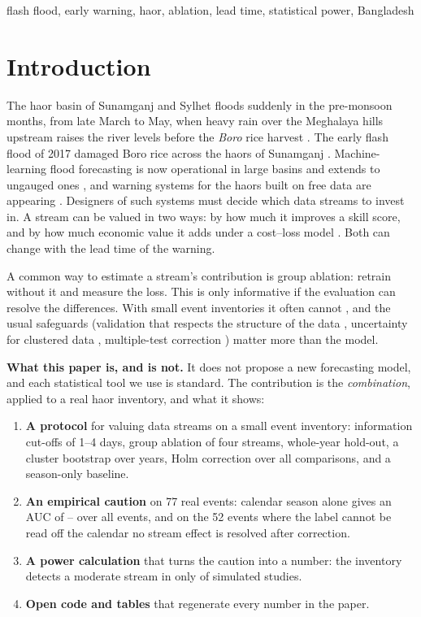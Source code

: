 \begin{IEEEkeywords}
flash flood, early warning, haor, ablation, lead time, statistical power, Bangladesh
\end{IEEEkeywords}

\section{Introduction}
The haor basin of Sunamganj and Sylhet floods suddenly in the pre-monsoon months, from late March to May, when heavy rain over the Meghalaya hills upstream raises the river levels before the \emph{Boro} rice harvest \cite{masood2024,mondal2019}. The early flash flood of 2017 damaged Boro rice across the haors of Sunamganj \cite{mondal2019}. Machine-learning flood forecasting is now operational in large basins \cite{nevo2022} and extends to ungauged ones \cite{nearing2024}, and warning systems for the haors built on free data are appearing \cite{koli2026haorfloodalert}. Designers of such systems must decide which data streams to invest in. A stream can be valued in two ways: by how much it improves a skill score, and by how much economic value it adds under a cost--loss model \cite{richardson2000}. Both can change with the lead time of the warning.

A common way to estimate a stream's contribution is group ablation: retrain without it and measure the loss. This is only informative if the evaluation can resolve the differences. With small event inventories it often cannot \cite{varoquaux2018,button2013}, and the usual safeguards (validation that respects the structure of the data \cite{roberts2017}, uncertainty for clustered data \cite{field2007}, multiple-test correction \cite{holm1979}) matter more than the model.

\textbf{What this paper is, and is not.} It does not propose a new forecasting model, and each statistical tool we use is standard. The contribution is the \emph{combination}, applied to a real haor inventory, and what it shows:
\begin{enumerate}
\item \textbf{A protocol} for valuing data streams on a small event inventory: information cut-offs of 1--4 days, group ablation of four streams, whole-year hold-out, a cluster bootstrap over years, Holm correction over all comparisons, and a season-only baseline.
\item \textbf{An empirical caution} on 77 real events: calendar season alone gives an AUC of \seasonAUCallLo--\seasonAUCallHi{} over all events, and on the 52 events where the label cannot be read off the calendar no stream effect is resolved after correction.
\item \textbf{A power calculation} that turns the caution into a number: the inventory detects a moderate stream in only \powerModAtN{} of simulated studies.
\item \textbf{Open code and tables} that regenerate every number in the paper.
\end{enumerate}

